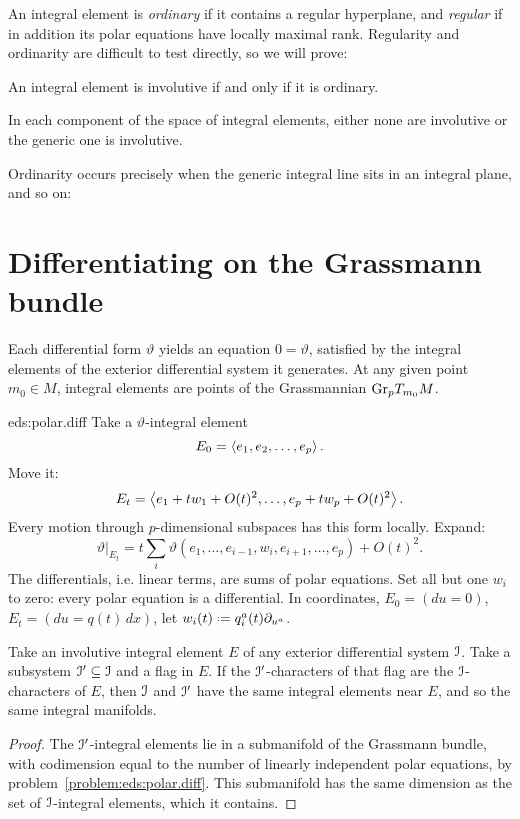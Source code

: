 An integral element is \emph{ordinary} if it contains a regular hyperplane, and \emph{regular} if in addition its polar equations have locally maximal rank.
Regularity and ordinarity are difficult to test directly, so we will prove:
\begin{theorem}\label{theorem:test}
An integral element is involutive if and only if it is ordinary.
\end{theorem}
\begin{corollary}
In each component of the space of integral elements, either none are involutive or the generic one is involutive.
\end{corollary}
Ordinarity occurs precisely when the generic integral line sits in an integral plane, and so on:
\section{Differentiating on the Grassmann bundle}
Each differential form \(\vartheta\) yields an equation \(0=\vartheta\), satisfied by the integral elements of the exterior differential system it generates.
At any given point \(m_0 \in M\), integral elements are points of the Grassmannian \(\operatorname{Gr}_{p}\!T_{m_0} M\).
\begin{answer}{eds:polar.diff}
Take a \(\vartheta\)-integral element 
\[
E_0=\left<e_1,e_2,\dots,e_p\right>.
\]
Move it:
\[
E_t=\left<e_1+tw_1+O(t)^2,\dots,e_p+tw_p+O(t)^2\right>.
\]
Every motion through \(p\)-dimensional subspaces has this form locally.
Expand:
\[
\left.\vartheta\right|_{E_t}=t\sum_i \vartheta(e_1,\dots,e_{i-1},w_i,e_{i+1},\dots,e_p)+O(t)^2.
\]
The differentials, i.e. linear terms, are sums of polar equations.
Set all but one \(w_i\) to zero: every polar equation is a differential.
In coordinates, \(E_0=(du=0)\), \(E_t=(du=q(t) \, dx)\), let \(w_i(t)\defeq q^a_i(t)\p{u^a}\).
\end{answer}
\begin{corollary}\label{corollary:same.int.elts}
Take an involutive integral element \(E\) of any exterior differential system \(\mathcal{I}\).
Take a subsystem \(\mathcal{I}'\subseteq\mathcal{I}\) and a flag in \(E\).
If the \(\mathcal{I}'\)-characters of that flag are the \(\mathcal{I}\)-characters of \(E\), then \(\mathcal{I}\) and \(\mathcal{I}'\) have the same integral elements near \(E\), and so the same integral manifolds.
\end{corollary}
\begin{proof}
The \(\mathcal{I}'\)-integral elements lie in a submanifold of the Grassmann bundle, with codimension equal to the number of linearly independent polar equations, by problem~\vref{problem:eds:polar.diff}.
This submanifold has the same dimension as the set of \(\mathcal{I}\)-integral elements, which it contains.
\end{proof}

